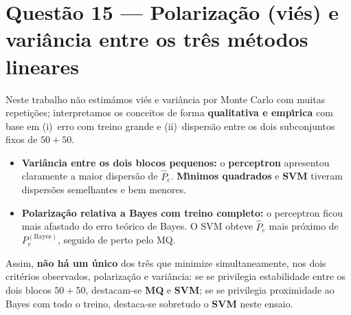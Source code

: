 \documentclass[12pt,a4paper]{article}
\begin{document}
\section*{Quest\~ao 15 --- Polariza\c{c}\~ao (vi\'es) e vari\^ancia entre os tr\^es m\'etodos lineares}

Neste trabalho n\~ao estim\'amos vi\'es e vari\^ancia por Monte Carlo com muitas repeti\c{c}\~oes; interpretamos os conceitos de forma \textbf{qualitativa e emp\'{\i}rica} com base em (i)~erro com treino grande e (ii)~dispers\~ao entre os dois subconjuntos fixos de $50{+}50$.

\begin{itemize}
  \item \textbf{Vari\^ancia entre os dois blocos pequenos:} o \textbf{perceptron} apresentou claramente a maior dispers\~ao de $\hat P_e$.
  \textbf{M\'{\i}nimos quadrados} e \textbf{SVM} tiveram dispers\~oes semelhantes e bem menores.
  \item \textbf{Polariza\c{c}\~ao relativa a Bayes com treino completo:} o perceptron ficou mais afastado do erro te\'orico de Bayes.
  O SVM obteve $\hat P_e$ mais pr\'oximo de $P_e^{\mathrm{(Bayes)}}$, seguido de perto pelo MQ.
\end{itemize}

Assim, \textbf{n\~ao h\'a um \'unico} dos tr\^es que minimize simultaneamente, nos dois crit\'erios observados, polariza\c{c}\~ao e vari\^ancia: se se privilegia estabilidade entre os dois blocos $50{+}50$, destacam-se \textbf{MQ} e \textbf{SVM}; se se privilegia proximidade ao Bayes com todo o treino, destaca-se sobretudo o \textbf{SVM} neste ensaio.
\end{document}
